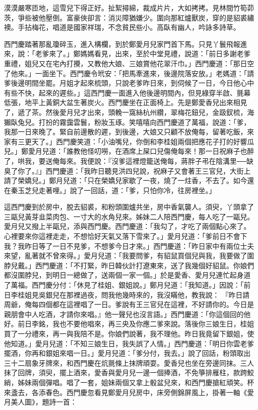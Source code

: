 \begin{showcontents}{}
漠漠嚴寒匝地，這雪兒下得正好。扯絮撏綿，裁成片片，大如拷拷。見林間竹筍茆茨，爭些被他壓倒。富豪俠卻言：消災障猶嫌少。圍向那紅爐獸炭，穿的是貂裘繡襖。手拈梅花，唱道是國家祥瑞，不念貧民些小。高臥有幽人，吟詠多詩草。

西門慶踏著那亂瓊碎玉，進入構欄，到於鄭愛月兒家門首下馬。只見丫鬟飛報進來，說：「老爹來了。」鄭媽媽看見，出來，至於中堂見禮，說道：「前日多謝老爹重禮，姐兒又在宅內打攪，又教他大娘、三娘賞他花翠汗巾。」西門慶道：「那日空了他來。」一面坐下。西門慶令玳安：「把馬牽進來，後邊院落安放。」老媽道：「請爹後邊明間坐罷。月姐才起來梳頭，只說老爹昨日來，到伺候了一日，今日他心中有些不快，起來的遲些。」這西門慶一面進入他後邊明間內，但見綠穿半啟、氈幕低張，地平上黃銅大盆生著炭火。西門慶坐在正面椅上。先是鄭愛香兒出來相見了，遞了茶。然後愛月兒才出來，頭輓一窩絲杭州纘，翠梅花鈕兒，金趿釵梳，海獺臥兔兒。打扮的霧靄雲鬟，粉妝玉琢。笑嘻嘻向西門慶道了萬福，說道：「爹，我那一日來晚了。緊自前邊散的遲，到後邊，大娘又只顧不放俺每，留著吃飯，來家有三更天了。」西門慶笑道：「小油嘴兒，你倒和李桂姐兩個把應花子打的好響瓜兒。」鄭愛月兒道：「誰教他怪叨嘮，在酒席上屎口兒傷俺每來！那一日祝麻子也醉了，哄我，要送俺每來。我便說：『沒爹這裡燈籠送俺每，蔣胖子弔在陰溝里──缺臭了你了。』」西門慶道：「我昨日聽見洪四兒說，祝麻子又會著王三官兒，大街上請了榮嬌兒。」鄭月兒道：「只在榮嬌兒家歇了一夜，燒了一炷香，不去了。如今還在秦玉芝兒走著哩。」說了一回話，道：「爹，只怕你冷，往房裡坐。」

這西門慶到於房中，脫去貂裘，和粉頭圍爐共坐，房中香氣襲人。須臾，丫頭拿了三甌兒黃芽韭菜肉包、一寸大的水角兒來。姊妹二人陪西門慶，每人吃了一甌兒。愛月兒又撥上半甌兒，添與西門慶。西門慶道：「我勾了，才吃了兩個點心來了。心裡要來你這裡走走，不想恰好天氣又落下雪來了。」愛月兒道：「爹前日不會下我？我昨日等了一日不見爹，不想爹今日才來。」西門慶道：「昨日家中有兩位士夫來望，亂著就不曾來得。」愛月兒道：「我要問爹，有貂鼠買個兒與我，我要做了圍脖兒戴。」西門慶道：「不打緊，昨日韓伙計打遼東來，送了我幾個好貂鼠。你娘們都沒圍脖兒，到明日一總做了，送兩個一家一個。」於是愛香、愛月兒連忙起身道了萬福。西門慶分付：「休見了桂姐、銀姐說。」鄭月兒道：「我知道。」因說：「前日李桂姐見吳銀兒在那裡過夜，問我他幾時來的，我沒瞞他，教我說： 『昨日請周爺，俺每四個都在這裡唱了一日。爹說有王三官兒在這裡，不好請你的。今日是親朋會中人吃酒，才請你來唱。』他一聲兒也沒言語。」西門慶道：「你這個回的他好。前日李銘，我也不要他唱來，再三央及你應二爹來說。落後你三娘生日，桂姐買了一分禮來，再一與我陪不是。你娘們說著，我不理他。昨日我竟留下銀姐，使他知道。」愛月兒道：「不知三娘生日，我失誤了人情。」西門慶道：「明日你雲老爹擺酒，你再和銀姐來唱一日。」愛月兒道：「爹分付，我去。」說了回話，粉頭取出三十二扇象牙牌來，和西門慶在炕氈條上抹牌頑耍。愛香兒也坐在旁邊同抹。三人抹了回牌，須臾，擺上酒來，愛香與愛月兒一邊一個捧酒，不免箏排雁柱，款跨鮫綃，姊妹兩個彈唱。唱了一套，姐妹兩個又拿上骰盆兒來，和西門慶搶紅頑笑。杯來盞去，各添春色。西門慶忽看見鄭愛月兒房中，床旁側錦屏風上，掛著一軸《愛月美人圖》，題詩一首：


\end{showcontents}
